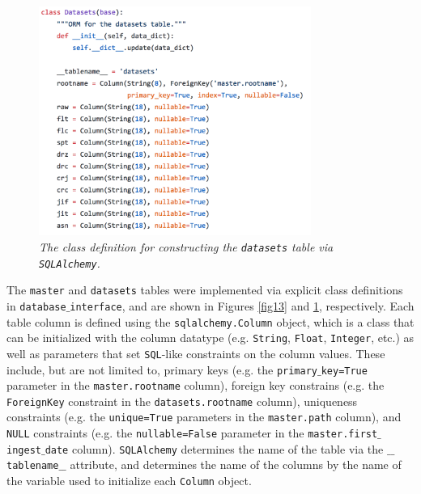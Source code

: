 \documentclass[10pt,journal,compsoc]{IEEEtran}
\begin{document}
\begin{figure}[!h]
\centering
\includegraphics[width=3.5in]{./figures/datasets_table.png}
\caption{\textit{The class definition for constructing the \texttt{datasets} table via \texttt{SQLAlchemy}.}}
\label{fig14}
\end{figure}

The \texttt{master} and \texttt{datasets} tables were implemented via explicit class definitions in \texttt{database$\_$interface}, and are shown in Figures \ref{fig13} and \ref{fig14},
respectively.  Each table column is defined using the \texttt{sqlalchemy.Column} object, which is a class that can be initialized with the column datatype (e.g. \texttt{String},
\texttt{Float}, \texttt{Integer}, etc.) as well as parameters that set \texttt{SQL}-like constraints on the column values.  These include, but are not limited to,
primary keys (e.g. the \texttt{primary$\_$key=True} parameter in the \texttt{master.rootname} column), foreign key constrains (e.g. the \texttt{ForeignKey} constraint in the
\texttt{datasets.rootname} column), uniqueness constraints (e.g. the \texttt{unique=True} parameters in the \texttt{master.path} column), and \texttt{NULL} constraints (e.g. the
\texttt{nullable=False} parameter in the \texttt{master.first$\_$ingest$\_$date} column).  \texttt{SQLAlchemy} determines the name of the table via the \texttt{$\_$$\_$tablename$\_$$\_$}
attribute, and determines the name of the columns by the name of the variable used to initialize each \texttt{Column} object.
\end{document}
